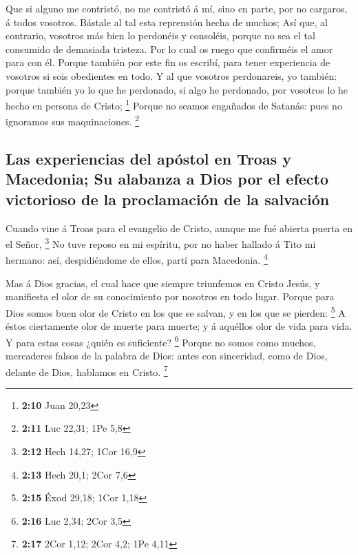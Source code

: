  Que si alguno me contristó, no me contristó á mí, sino en
parte, por no cargaros, á todos vosotros.  Bástale al tal
esta reprensión hecha de muchos;  Así que, al contrario,
vosotros más bien lo perdonéis y consoléis, porque no sea el tal
consumido de demasiada tristeza.  Por lo cual os ruego que
confirméis el amor para con él.  Porque también por este
fin os escribí, para tener experiencia de vosotros si sois obedientes en
todo.  Y al que vosotros perdonareis, yo también: porque
también yo lo que he perdonado, si algo he perdonado, por vosotros lo he
hecho en persona de Cristo; \footnote{\textbf{2:10} Juan 20,23}
 Porque no seamos engañados de Satanás: pues no ignoramos
sus maquinaciones. \footnote{\textbf{2:11} Luc 22,31; 1Pe 5,8}

\hypertarget{las-experiencias-del-apuxf3stol-en-troas-y-macedonia-su-alabanza-a-dios-por-el-efecto-victorioso-de-la-proclamaciuxf3n-de-la-salvaciuxf3n}{%
\subsection{Las experiencias del apóstol en Troas y Macedonia; Su
alabanza a Dios por el efecto victorioso de la proclamación de la
salvación}\label{las-experiencias-del-apuxf3stol-en-troas-y-macedonia-su-alabanza-a-dios-por-el-efecto-victorioso-de-la-proclamaciuxf3n-de-la-salvaciuxf3n}}

 Cuando vine á Troas para el evangelio de Cristo, aunque
me fué abierta puerta en el Señor, \footnote{\textbf{2:12} Hech 14,27;
  1Cor 16,9}  No tuve reposo en mi espíritu, por no haber
hallado á Tito mi hermano: así, despidiéndome de ellos, partí para
Macedonia. \footnote{\textbf{2:13} Hech 20,1; 2Cor 7,6}

 Mas á Dios gracias, el cual hace que siempre triunfemos
en Cristo Jesús, y manifiesta el olor de su conocimiento por nosotros en
todo lugar.  Porque para Dios somos buen olor de Cristo
en los que se salvan, y en los que se pierden: \footnote{\textbf{2:15}
  Éxod 29,18; 1Cor 1,18}  A éstos ciertamente olor de
muerte para muerte; y á aquéllos olor de vida para vida. Y para estas
cosas ¿quién es suficiente? \footnote{\textbf{2:16} Luc 2,34; 2Cor 3,5}
 Porque no somos como muchos, mercaderes falsos de la
palabra de Dios: antes con sinceridad, como de Dios, delante de Dios,
hablamos en Cristo. \footnote{\textbf{2:17} 2Cor 1,12; 2Cor 4,2; 1Pe
  4,11}

